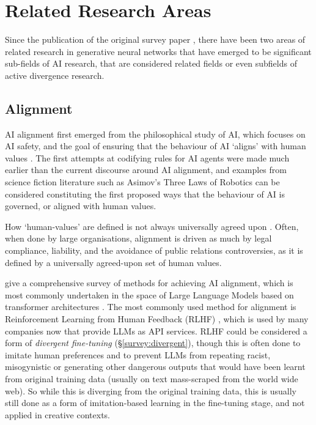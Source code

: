 \section{Related Research Areas}
\label{c6:sec:related-research}

Since the publication of the original survey paper \citep{broad2021active}, there have been two areas of related research in generative neural networks that have emerged to be significant sub-fields of AI research, that are considered related fields or even subfields of active divergence research. 

\subsection{Alignment}
\label{c6:subsec:alignment}

AI alignment first emerged from the philosophical study of AI, which focuses on AI safety, and the goal of ensuring that the behaviour of AI `aligns' with human values \citep{yudkowsky2016ai, gabriel2020artificial}. 
The first attempts at codifying rules for AI agents were made much earlier than the current discourse around AI alignment, and examples from science fiction literature such as Asimov's Three Laws of Robotics \citep{asimov1942runaround} can be considered constituting the first proposed ways that the behaviour of AI is governed, or aligned with human values. 

How `human-values' are defined is not always universally agreed upon \citep{turchin2019ai}. 
Often, when done by large organisations, alignment is driven as much by legal compliance, liability, and the avoidance of public relations controversies, as it is defined by a universally agreed-upon set of human values. 

\cite{ji2023ai} give a comprehensive survey of methods for achieving AI alignment, which is most commonly undertaken in the space of Large Language Models based on transformer architectures \citep{vaswani2017attention}. 
The most commonly used method for alignment is Reinforcement Learning from Human Feedback (RLHF) \citep{ziegler2019fine}, which is used by many companies now that provide LLMs as API services. 
RLHF could be considered a form of \textit{divergent fine-tuning} (\S \ref{survey:divergent}), though this is often done to imitate human preferences and to prevent LLMs from repeating racist, misogynistic or generating other dangerous outputs that would have been learnt from original training data (usually on text mass-scraped from the world wide web).
So while this is diverging from the original training data, this is usually still done as a form of imitation-based learning in the fine-tuning stage, and not applied in creative contexts.

